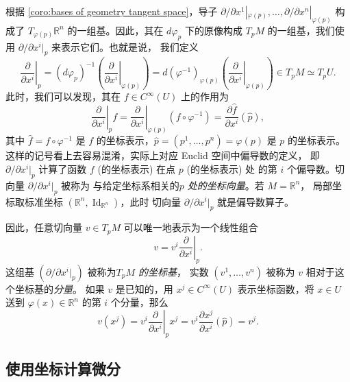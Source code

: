 \documentclass[fontset=none]{Notes}
\DeclareMathOperator\Id{Id}
\begin{document}
根据 \autoref{coro:bases of geometry tangent space}，导子 
$\partial/\partial x^1|_{\varphi(p)},\dots,\partial/\partial x^n|_{\varphi(p)}$
构成了 $T_{\varphi(p)}\mathbb{R}^n$ 的一组基。因此，其在
$d\varphi_p$ 下的原像构成 $T_pM$ 的一组基，我们使用
$\partial/\partial x^i|_p$ 来表示它们。也就是说，
我们定义
\[
  \left.\frac{\partial}{\partial x^i}\right|_p=(d\varphi_p)^{-1}\left(
    \left.\frac{\partial}{\partial x^i}\right|_{\varphi(p)}
  \right)=d(\varphi^{-1})_{\varphi(p)}\left(
    \left.\frac{\partial}{\partial x^i}\right|_{\varphi(p)}
  \right)\in T_pM\simeq T_pU.
\]
此时，我们可以发现，其在 $f\in C^\infty(U)$ 上的作用为
\[
  \left.\frac{\partial}{\partial x^i}\right|_pf=
  \left.\frac{\partial}{\partial x^i}\right|_{\varphi(p)}(f\circ\varphi^{-1})
  =\frac{\partial \hat f}{\partial x^i}(\hat p),
\]
其中 $\hat f=f\circ\varphi^{-1}$ 是 $f$ 的坐标表示，$\hat p=(p^1,\dots,p^n)=\varphi(p)$
是 $p$ 的坐标表示。这样的记号看上去容易混淆，实际上对应 Euclid 空间中偏导数的定义，
即 $\partial/\partial x^i|_p$ 计算了函数 $f$ (的坐标表示) 在点 $p$ (的坐标表示) 处
的第 $i$ 个偏导数。切向量 $\partial/\partial x^i|_p$ 被称为
与给定坐标系相关的\emph{$p$ 处的坐标向量}。若 $M=\mathbb{R}^n$，
局部坐标取标准坐标 $(\mathbb{R}^n,\Id_{\mathbb{R}^n})$，此时
切向量 $\partial/\partial x^i|_p$ 就是偏导数算子。

因此，任意切向量 $v\in T_pM$ 可以唯一地表示为一个线性组合
\[
  v=v^i\!\left.\frac{\partial}{\partial x^i}\right|_p.
\]
这组基 $\left(\partial/\partial x^i|_p\right)$ 被称为\emph{$T_pM$ 的坐标基}，
实数 $(v^1,\dots,v^n)$ 被称为 $v$ 相对于这个坐标基的\emph{分量}。
如果 $v$ 是已知的，用 $x^j\in C^\infty(U)$ 表示坐标函数，将
$x\in U$ 送到 $\varphi(x)\in\mathbb{R}^n$ 的第 $i$ 个分量，那么
\[
  v(x^j)=v^i\!\left.\frac{\partial}{\partial x^i}\right|_px^j=
  v^i\frac{\partial x^j}{\partial x^i}(\hat p)=v^j.
\]


\subsection{使用坐标计算微分}
\end{document}
